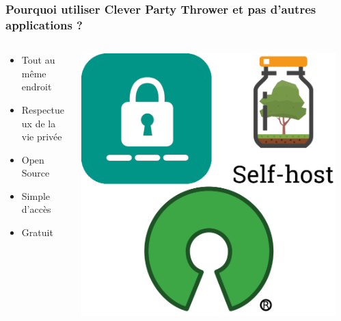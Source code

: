 \documentclass[aspectratio=169]{beamer}
\begin{document}
    \begin{frame}
        \frametitle{Pourquoi utiliser Clever Party Thrower et pas d'autres applications ?}
        \begin{columns}
            \begin{column}{0.5\textwidth}
                \begin{itemize}
                    \item Tout au même endroit
                    \item Respectueux de la vie privée
                    \item Open Source
                    \item Simple d'accès
                    \item Gratuit
                \end{itemize}
            \end{column}

            \begin{column}{0.3\textwidth}
                \begin{flushleft}
                    \includegraphics[width=1\textwidth]{imgs/selfHost&opensource}\label{fig:figure8}
                \end{flushleft}
            \end{column}
            \begin{column}{0.2\textwidth}

            \end{column}
        \end{columns}

    \end{frame}
\end{document}
